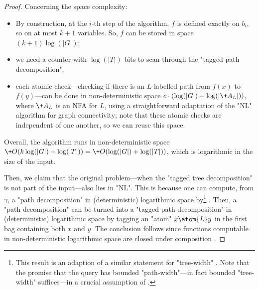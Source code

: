 \begin{proof}
	Concerning the space complexity:
	\begin{itemize}
		\item By construction, at the $i$-th step of the algorithm, $f$ is defined exactly on $b_i$, so on at most $k+1$ variables.
		So, $f$ can be stored in space $(k+1)\log(|G|)$;
		\item we need a counter with $\log(|T|)$ bits to scan through the "tagged path decomposition",
		\item each atomic check---checking if there is an $L$-labelled path from $f(x)$ to $f(y)$---can be done in non-deterministic space $c\cdot (\log(|G|) + \log(|\+A_L|))$,
		where $\+A_L$ is an NFA for $L$, using a straightforward adaptation of the "NL" algorithm for graph connectivity; note that these atomic checks are
		independent of one another, so we can reuse this space.
	\end{itemize}
	Overall, the algorithm runs in non-deterministic space
	$\+O(k\log(|G|) + \log(|T|)) = \+O(\log(|G|) + \log(|T|))$,
	which is logarithmic in the size of the input.

	\smallskip

	Then, we claim that the original problem---when the "tagged tree decomposition" is not part of 
	the input---also lies in "NL". This is because one can compute, from $\gamma$, a
	"path decomposition" in (deterministic) logarithmic space by\footnote{This result is an 
	adaption of a similar statement for "tree-width" \cite[Theorem I.1, p. 143]{EJT10Logspace}. Note that the promise that the query has bounded "path-width"---in fact bounded "tree-width" suffices---in a crucial assumption of  \cite[Theorem I.1, p. 143]{EJT10Logspace}.} 
	\cite[Theorem 1.3, p. 2]{KM10Computing}. Then, a "path decomposition" can be turned into a 
	"tagged path decomposition" in (deterministic) logarithmic space by tagging an "atom"
	$x \atom{L} y$ in the first bag containing both $x$ and $y$.
	The conclusion follows since functions computable in non-deterministic logarithmic space
	are closed under composition \cite[Lemma 4.17, p. 88]{AB09Computational}. 
\end{proof}

